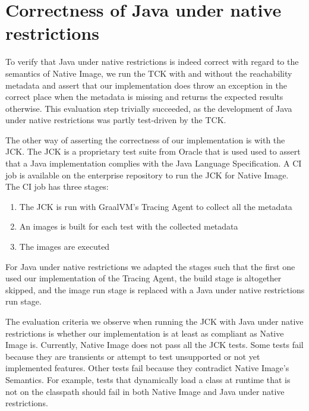 \section{Correctness of Java under native restrictions}
To verify that Java under native restrictions is indeed correct with regard to the semantics of Native Image, we run the TCK with and without the reachability metadata and assert that our implementation does throw an exception in the correct place when the metadata is missing and returns the expected results otherwise. This evaluation step trivially succeeded, as the development of Java under native restrictions was partly test-driven by the TCK.

The other way of asserting the correctness of our implementation is with the JCK. The JCK is a proprietary test suite from Oracle that is used used to assert that a Java implementation complies with the Java Language Specification. A CI job is available on the enterprise repository to run the JCK for Native Image. The CI job has three stages:
\begin{enumerate}
    \item The JCK is run with GraalVM's Tracing Agent to collect all the metadata
    \item An images is built for each test with the collected metadata
    \item The images are executed
\end{enumerate}
For Java under native restrictions we adapted the stages such that the first one used our implementation of the Tracing Agent, the build stage is altogether skipped, and the image run stage is replaced with a Java under native restrictions run stage.

The evaluation criteria we observe when running the JCK with Java under native restrictions is whether our implementation is at least as compliant as Native Image is. Currently, Native Image does not pass all the JCK tests. Some tests fail because they are transients or attempt to test unsupported or not yet implemented features. Other tests fail because they contradict Native Image's Semantics. For example, tests that dynamically load a class at runtime that is not on the classpath should fail in both Native Image and Java under native restrictions. 

